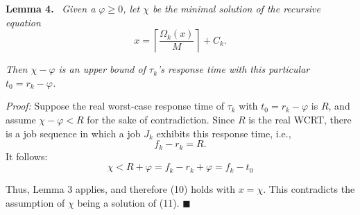 \textbf{Lemma 4.} \ \textit{Given a $\varphi \geq 0$, let $\chi$ be the minimal solution of the recursive equation}
\[
x=\left\lceil \frac{\Omega_k(x)}{M} \right\rceil + C_k.
\tag{11}
\]

\textit{Then $\chi-\varphi$ is an upper bound of $\tau_k$'s response time with this particular $t_0=r_k-\varphi$.}

\bigskip

\noindent
\textit{Proof:} Suppose the real worst-case response time of $\tau_k$ with $t_0=r_k-\varphi$ is $R$, and assume $\chi-\varphi<R$ for the sake of contradiction. Since $R$ is the real WCRT, there is a job sequence in which a job $J_k$ exhibits this response time, i.e.,
\[
f_k-r_k=R.
\]
It follows:
\[
\chi<R+\varphi=f_k-r_k+\varphi=f_k-t_0
\]

Thus, Lemma 3 applies, and therefore (10) holds with $x=\chi$. This contradicts the assumption of $\chi$ being a solution of (11). \hfill $\blacksquare$
